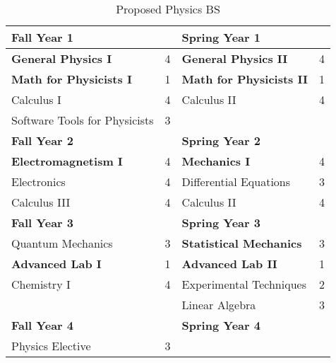 \documentclass[12pt,preprint]{aastex}
\begin{document}

\begin{table}[h!]
\caption{Proposed Physics BS}
\medskip
\begin{tabular}{lclc}
\hline
{\bf Fall Year 1} &  & {\bf Spring Year 1} &  \\
\hline
\hline
{\bf General Physics I}       & 4 & {\bf General Physics II} & 4 \\
{\bf Math for Physicists I}   & 1 & {\bf Math for Physicists II} & 1 \\
Calculus I                    & 4 & Calculus II & 4 \\
Software Tools for Physicists & 3 &   &  \\
\hline
{\bf Fall Year 2} &  & {\bf Spring Year 2} &  \\
\hline
\hline
{\bf Electromagnetism I}  & 4 & {\bf Mechanics I} & 4 \\
Electronics         & 4 & Differential Equations & 3 \\
Calculus III        & 4 & Calculus II & 4 \\
\hline
{\bf Fall Year 3} &  & {\bf Spring Year 3} &  \\
\hline
\hline
Quantum Mechanics    & 3 & {\bf Statistical Mechanics} & 3 \\
{\bf Advanced Lab I} & 1 & {\bf Advanced Lab II} & 1 \\
Chemistry I          & 4 & Experimental Techniques & 2 \\
                     &   & Linear Algebra & 3 \\
\hline
{\bf Fall Year 4} &  & {\bf Spring Year 4} &  \\
\hline
\hline
Physics Elective & 3 & &  \\
\end{tabular}
\end{table}
\end{document}
